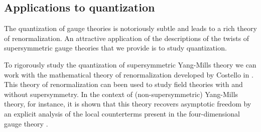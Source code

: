 \documentclass[10pt, oneside]{article}
\begin{document}

\subsection*{Applications to quantization}

The quantization of gauge theories is notoriously subtle and leads to a rich theory of renormalization.
An attractive application of the descriptions of the twists of supersymmetric gauge theories that we provide is to study quantization.

To rigorously study the quantization of supersymmetric Yang-Mills theory we can work with the mathematical theory of renormalization developed by Costello in \cite{CosRenorm}. 
This theory of renormalization can been used to study field theories with and without supersymmetry. 
In the context of (non-supersymmetric) Yang-Mills theory, for instance, it is shown that this theory recovers asymptotic freedom by an explicit analysis of the local counterterms present in the four-dimensional gauge theory \cite{EWY}.  
\end{document}
